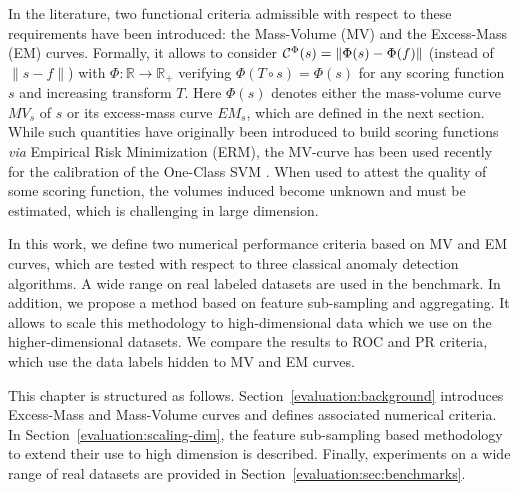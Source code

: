 In the literature, two functional criteria admissible with respect to these requirements have been introduced: the Mass-Volume (MV) \cite{CLEM13,CLEM14} and the Excess-Mass (EM) \cite{AISTAT15} curves.
Formally, it allows to consider $\mathcal{C}^{\Phi}(s) = \| \Phi(s) - \Phi(f) \|$ (instead of $\|s - f\|$) %
with $\Phi: \mathbb{R} \to \mathbb{R}_+$ verifying $\Phi(T \circ s) = \Phi(s)$ 
for any scoring function $s$ and increasing transform $T$. Here $\Phi(s)$ denotes either the mass-volume curve $MV_s$ of $s$ or its excess-mass curve $EM_s$, which are defined in the next section.  
While such quantities have originally been introduced to build scoring functions \emph{via}
Empirical Risk Minimization (ERM), the MV-curve has been used recently for the calibration of the One-Class SVM \cite{Thomas2015}.
When used to attest the quality of some scoring function, the volumes induced become unknown and must be estimated, which is challenging in large dimension.

In this work, we define two numerical performance criteria based on MV and EM curves, which are tested with respect to three classical anomaly detection algorithms. A wide range on real labeled datasets are used in the benchmark. In addition, we propose a method based on feature sub-sampling and aggregating. It allows to scale %
 this methodology to high-dimensional data which we use on the higher-dimensional datasets. We compare the results to ROC and PR criteria, which use the data labels hidden to MV and EM curves. 

 This chapter is structured as follows. Section~\ref{evaluation:background} introduces Excess-Mass and Mass-Volume curves and defines associated numerical criteria. In Section~\ref{evaluation:scaling-dim}, the feature sub-sampling based methodology to extend their use to high dimension is described. Finally, experiments on a wide range of real datasets are provided in Section~\ref{evaluation:sec:benchmarks}.


